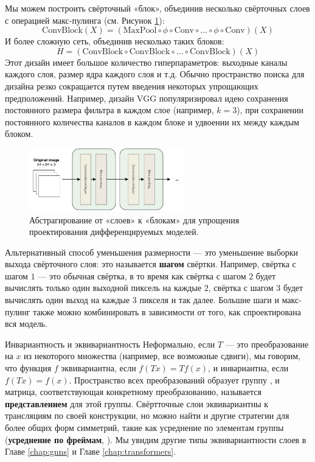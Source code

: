 Мы можем построить свёрточный «блок», объединив несколько свёрточных слоев с операцией макс-пулинга (см. Рисунок \ref{fig:cnn_blocks}):
%
$$
\text{ConvBlock}(X)= (\text{MaxPool} \circ \phi \circ \text{Conv}\circ\ldots\circ\phi\circ\text{Conv})(X)
$$
%
И более сложную сеть, объединив несколько таких блоков:
%
\begin{equation}
H = (\text{ConvBlock}\circ\text{ConvBlock}\circ\ldots\circ\text{ConvBlock})(X)
\label{eq:convolutive_backbone}
\end{equation}
%
Этот дизайн имеет большое количество гиперпараметров: выходные каналы каждого слоя, размер ядра каждого слоя и т.д. Обычно пространство поиска для дизайна резко сокращается путем введения некоторых упрощающих предположений. Например, дизайн VGG \cite{szegedy2015going} популяризировал идею сохранения постоянного размера фильтра в каждом слое (например, $k=3$), при сохранении постоянного количества каналов в каждом блоке и удвоении их между каждым блоком.

\begin{figure}
    \centering
    \hspace{1em}\includegraphics[width=0.6\textwidth]{images/CNN_blocks}
    \caption{Абстрагирование от «слоев» к «блокам» для упрощения проектирования дифференцируемых моделей.}
    \label{fig:cnn_blocks}
\end{figure}

Альтернативный способ уменьшения размерности — это уменьшение выборки выхода свёрточного слоя: это называется \textbf{шагом} свёртки. Например, свёртка с шагом $1$ — это обычная свёртка, в то время как свёртка с шагом $2$ будет вычислять только один выходной пиксель на каждые $2$, свёртка с шагом $3$ будет вычислять один выход на каждые $3$ пикселя и так далее. Большие шаги и макс-пулинг также можно комбинировать в зависимости от того, как спроектирована вся модель.

\begin{supportbox}{Инвариантность и эквивариантность}
Неформально, если $T$ — это преобразование на $x$ из некоторого множества (например, все возможные сдвиги), мы говорим, что функция $f$ эквивариантна, если $f(Tx)=Tf(x)$, и инвариантна, если $f(Tx)=f(x)$. Пространство всех преобразований образует группу \cite{bronstein2017geometric}, и матрица, соответствующая конкретному преобразованию, называется \textbf{представлением} для этой группы. Свёртточные слои эквивариантны к трансляциям по своей конструкции, но можно найти и другие стратегии для более общих форм симметрий, такие как усреднение по элементам группы (\textbf{усреднение по фреймам}, \cite{puny2021frame}). Мы увидим другие типы эквивариантности слоев в Главе \ref{chap:gnns} и Главе \ref{chap:transformers}.
\end{supportbox}

